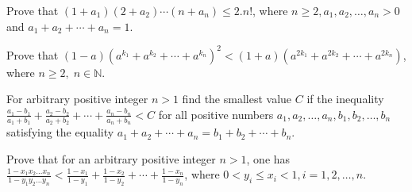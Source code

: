 \item Prove that $(1 + a_1)(2 + a_2)\cdots(n + a_n)\leq 2.n!$, where $n\geq 2, a_1, a_2, \ldots, a_n > 0$ and $a_1 + a_2 + \cdots +
  a_n = 1$.
\item Prove that $(1 - a)(a^{k_1} + a^{k_2} + \cdots + a^{k_n})^2 < (1 + a)(a^{2k_1} + a^{2k_2} + \cdots + a^{2k_n})$, where $n\geq
  2,\;n\in\mathbb{N}$.
\item For arbitrary positive integer $n > 1$ find the smallest value $C$ if the inequality $\frac{a_1 - b_1}{a_1 + b_1} + \frac{a_2
- b_2}{a_2 + b_2} + \cdots + \frac{a_n - b_n}{a_n + b_n} < C$ for all positive numbers $a_1, a_2, \ldots, a_n, b_1, b_2, \ldots,
  b_n$ satisfying the equality $a_1 + a_2 + \cdots + a_n = b_1 + b_2 + \cdots + b_n$.
\item Prove that for an arbitrary positive integer $n > 1$, one has $\frac{1 - x_1x_2\ldots x_n}{1 - y_1y_2\ldots y_n} < \frac{1 -
  x_1}{1 - y_1} + \frac{1 - x_2}{1 - y_2} + \cdots + \frac{1 - x_n}{1 - y_n}$, where $0 < y_i\leq x_i < 1, i = 1, 2, \ldots, n$.
\stopitemize
